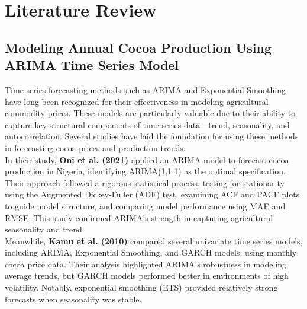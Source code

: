 \chapter{Literature Review}

\section{Modeling Annual Cocoa Production Using ARIMA Time Series Model}

Time series forecasting methods such as ARIMA and Exponential Smoothing have long been recognized for their effectiveness in modeling agricultural commodity prices. These models are particularly valuable due to their ability to capture key structural components of time series data—trend, seasonality, and autocorrelation. Several studies have laid the foundation for using these methods in forecasting cocoa prices and production trends. \\

In their study, \textbf{Oni et al. (2021)} applied an ARIMA model to forecast cocoa production in Nigeria, identifying ARIMA(1,1,1) as the optimal specification. Their approach followed a rigorous statistical process: testing for stationarity using the Augmented Dickey-Fuller (ADF) test, examining ACF and PACF plots to guide model structure, and comparing model performance using MAE and RMSE. This study confirmed ARIMA’s strength in capturing agricultural seasonality and trend. \\

Meanwhile, \textbf{Kamu et al. (2010)} compared several univariate time series models, including ARIMA, Exponential Smoothing, and GARCH models, using monthly cocoa price data. Their analysis highlighted ARIMA's robustness in modeling average trends, but GARCH models performed better in environments of high volatility. Notably, exponential smoothing (ETS) provided relatively strong forecasts when seasonality was stable. \\

